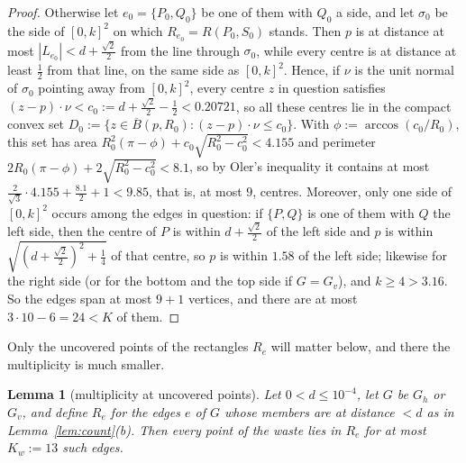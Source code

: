 \documentclass[11pt]{amsart}
\newtheorem{lemma}[theorem]{Lemma}
\theoremstyle{definition}
\theoremstyle{remark}
\begin{document}
\begin{proof}
Otherwise let $e_0=\{P_0,Q_0\}$ be one of them with $Q_0$ a side, and let $\sigma_0$ be the side of $[0,k]^2$ on which
$R_{e_0}=R(P_0,S_0)$ stands. Then $p$ is at distance at most $|L_{e_0}|<d+\frac{\sqrt2}2$ from the line through $\sigma_0$, while every
centre is at distance at least $\frac12$ from that line, on the same side as $[0,k]^2$. Hence, if $\nu$ is the unit normal of $\sigma_0$
pointing away from $[0,k]^2$, every centre $z$ in question satisfies $(z-p)\cdot\nu<c_0:=d+\frac{\sqrt2}2-\frac12<0.20721$, so all these
centres lie in the compact convex set $D_0:=\{z\in\overline B(p,R_0):(z-p)\cdot\nu\le c_0\}$. With
$\phi:=\arccos(c_0/R_0)$, this set has area $R_0^2(\pi-\phi)+c_0\sqrt{R_0^2-c_0^2}<4.155$ and perimeter $2R_0(\pi-\phi)+2\sqrt{R_0^2-c_0^2}<8.1$,
so by Oler's inequality it contains at most $\frac2{\sqrt3}\cdot4.155+\frac{8.1}2+1<9.85$, that is, at most $9$, centres.
Moreover, only one side of $[0,k]^2$ occurs among the edges in question: if $\{P,Q\}$ is one of them with $Q$ the left side, then the
centre of $P$ is within $d+\frac{\sqrt2}2$ of the left side and $p$ is within $\sqrt{(d+\frac{\sqrt2}2)^2+\frac14}$ of that centre, so $p$ is
within $1.58$ of the left side; likewise for the right side (or for the bottom and the top side if $G=G_v$), and $k\ge4>3.16$. So the
edges span at most $9+1$ vertices, and there are at most $3\cdot10-6=24<K$ of them.
\end{proof}

Only the uncovered points of the rectangles $R_e$ will matter below, and there the multiplicity is much smaller.

\begin{lemma}[multiplicity at uncovered points]\label{lem:Kw}
Let $0<d\le10^{-4}$, let $G$ be $G_h$ or $G_v$, and define $R_e$ for the edges $e$ of $G$ whose members are at distance $<d$ as
in Lemma~\ref{lem:count}(b). Then every point of the waste lies in $R_e$ for at most $K_w:=13$ such edges.
\end{lemma}
\end{document}
